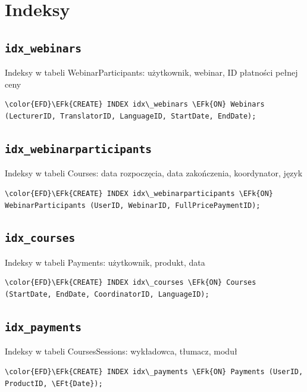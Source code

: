 \documentclass[11pt]{article}
\newcommand{\EFk}[1]{\textcolor{EFk}{\textbf{#1}}} %
\newcommand{\EFt}[1]{\textcolor{EFt}{\textbf{#1}}} %
\begin{document}
\section{Indeksy}
\label{sec:org929520c}
\subsection{\texttt{idx\_webinars}}
\label{sec:org3113a0d}
Indeksy w tabeli WebinarParticipants: użytkownik, webinar, ID płatności pełnej ceny
\begin{Code}
\begin{Verbatim}
\color{EFD}\EFk{CREATE} INDEX idx\_webinars \EFk{ON} Webinars (LecturerID, TranslatorID, LanguageID, StartDate, EndDate);
\end{Verbatim}
\end{Code}
\subsection{\texttt{idx\_webinarparticipants}}
\label{sec:org9afc2f5}
Indeksy w tabeli Courses: data rozpoczęcia, data zakończenia, koordynator, język
\begin{Code}
\begin{Verbatim}
\color{EFD}\EFk{CREATE} INDEX idx\_webinarparticipants \EFk{ON} WebinarParticipants (UserID, WebinarID, FullPricePaymentID);
\end{Verbatim}
\end{Code}
\subsection{\texttt{idx\_courses}}
\label{sec:org6858539}
Indeksy w tabeli Payments: użytkownik, produkt, data
\begin{Code}
\begin{Verbatim}
\color{EFD}\EFk{CREATE} INDEX idx\_courses \EFk{ON} Courses (StartDate, EndDate, CoordinatorID, LanguageID);
\end{Verbatim}
\end{Code}
\subsection{\texttt{idx\_payments}}
\label{sec:org83aecdc}
Indeksy w tabeli CoursesSessions: wykładowca, tłumacz, moduł
\begin{Code}
\begin{Verbatim}
\color{EFD}\EFk{CREATE} INDEX idx\_payments \EFk{ON} Payments (UserID, ProductID, \EFt{Date});
\end{Verbatim}
\end{Code}
\end{document}
